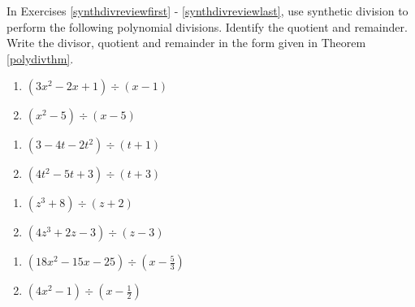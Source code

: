 \documentclass{ximera}
\begin{document}
	\author{Stitz-Zeager}



In Exercises \ref{synthdivreviewfirst} - \ref{synthdivreviewlast}, use synthetic division to perform the following polynomial divisions.  Identify the quotient and remainder. Write the divisor, quotient and remainder in the form given in Theorem \ref{polydivthm}.

\begin{multicols}{2}
\begin{enumerate}


\item $\left(3x^2-2x+1 \right) \div \left(x-1\right)$ \label{synthdivreviewfirst}
\item $\left(x^2-5 \right) \div \left(x-5\right)$

\setcounter{HW}{\value{enumi}}
\end{enumerate}
\end{multicols}

\begin{multicols}{2}
\begin{enumerate}
\setcounter{enumi}{\value{HW}}

\item $\left(3-4t-2t^2 \right) \div \left(t+1\right)$
\item $\left(4t^2-5t +3\right) \div \left(t+3\right)$

\setcounter{HW}{\value{enumi}}
\end{enumerate}
\end{multicols}

\begin{multicols}{2}
\begin{enumerate}
\setcounter{enumi}{\value{HW}}

\item $\left(z^3 + 8 \right) \div \left(z+2\right)$
\item $\left(4z^3 +2z-3 \right) \div \left(z -3\right)$

\setcounter{HW}{\value{enumi}}
\end{enumerate}
\end{multicols}

\begin{multicols}{2}
\begin{enumerate}
\setcounter{enumi}{\value{HW}}

\item $\left(18x^2-15x-25\right) \div \left(x - \frac{5}{3} \right)$
\item $\left(4x^2-1 \right) \div \left(x - \frac{1}{2} \right)$

\setcounter{HW}{\value{enumi}}
\end{enumerate}
\end{multicols}
\end{document}
